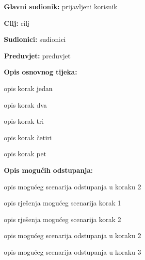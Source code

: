 \begin{packed_enum}
\begin{packed_item}
\begin{packed_item}
							
						\end{packed_item}
					\end{packed_item}
					
					\noindent {}
					\begin{packed_item}
						
						\item \textbf{Glavni sudionik: }prijavljeni korisnik
						\item  \textbf{Cilj:} cilj
						\item  \textbf{Sudionici:} sudionici
						\item  \textbf{Preduvjet:} preduvjet
						\item  \textbf{Opis osnovnog tijeka:}
						
						\item[] \begin{packed_enum}
							
							\item opis korak jedan
							\item opis korak dva
							\item opis korak tri
							\item opis korak četiri
							\item opis korak pet
						\end{packed_enum}
						
						\item  \textbf{Opis mogućih odstupanja:}
						
						\item[] \begin{packed_item}
							
							\item[2.a] opis mogućeg scenarija odstupanja u koraku 2
							\item[] \begin{packed_enum}
								
								\item opis rješenja mogućeg scenarija korak 1
								\item opis rješenja mogućeg scenarija korak 2
								
							\end{packed_enum}
							\item[2.b] opis mogućeg scenarija odstupanja u koraku 2
							\item[3.a] opis mogućeg scenarija odstupanja  u koraku 3
							
						\end{packed_item}
					\end{packed_item}
					

\end{packed_enum}
